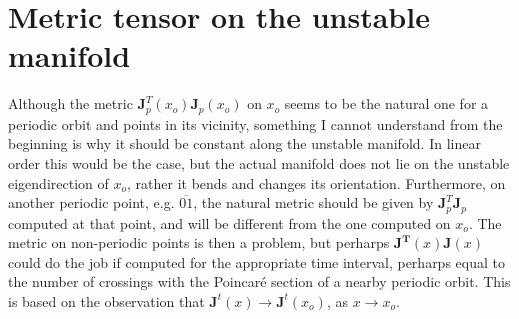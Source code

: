\documentclass[article,preprint]{revtex4}
\begin{document}
\section{Metric tensor on the unstable manifold}

  Although the metric $\mathbf{J}_p^T(x_o)\mathbf{J}_p(x_o)$ on $x_o$ seems to
  be the natural one for a periodic orbit and points in its vicinity,
  something I cannot understand from the beginning is why it should be constant along the unstable
  manifold. In linear order this would be the case, but the actual
  manifold does not lie on the unstable eigendirection of $x_o$,
  rather it bends and changes its orientation. Furthermore, on another
  periodic point, e.g. $\overline{01}$, the natural metric should be
  given by $\mathbf{J}_p^T\mathbf{J}_p$ computed at that point, and
  will be different from the one computed on $x_o$. The metric on non-periodic
  points is then a problem, but perharps $\mathbf{J^T}(x)\mathbf{J}(x)$
  could do the job if computed for the appropriate time interval,
  perharps equal to the number of crossings with the Poincar\'e
  section of a nearby periodic orbit. This is based on the observation
  that $\mathbf{J}^t(x)\rightarrow\mathbf{J}^t(x_o)$, as $x \rightarrow
  x_o$.  
\end{document}
